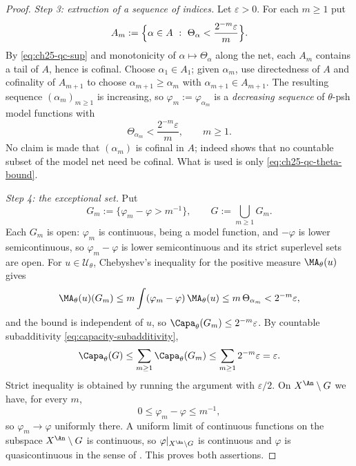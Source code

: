 \begin{proof}
\emph{Step 3: extraction of a sequence of indices.}  Let $\varepsilon>0$.
For each $m\geq1$ put
\[
 A_m:=\Bigl\{\alpha\in A\ :\
   \Theta_\alpha<\frac{2^{-m}\varepsilon}{m}\Bigr\}.
\]
By \eqref{eq:ch25-qc-sup} and monotonicity of $\alpha\mapsto\Theta_\alpha$
along the net, each $A_m$ contains a tail of $A$, hence is cofinal.
Choose $\alpha_1\in A_1$; given $\alpha_{m}$, use directedness of $A$
and cofinality of $A_{m+1}$ to choose
$\alpha_{m+1}\geq\alpha_m$ with $\alpha_{m+1}\in A_{m+1}$.  The resulting
sequence $(\alpha_m)_{m\geq1}$ is increasing, so
$\varphi_m:=\varphi_{\alpha_m}$ is a \emph{decreasing sequence} of
$\theta$-psh model functions with
\begin{equation}
\label{eq:ch25-qc-theta-bound}
 \Theta_{\alpha_m}<\frac{2^{-m}\varepsilon}{m},\qquad m\geq1 .
\end{equation}
No claim is made that $(\alpha_m)$ is cofinal in $A$; indeed
 shows that no countable subset of the
model net need be cofinal.  What is used is only
\eqref{eq:ch25-qc-theta-bound}.

\emph{Step 4: the exceptional set.}  Put
\[
 G_m:=\bigl\{\varphi_m-\varphi>m^{-1}\bigr\},
 \qquad
 G:=\bigcup_{m\geq1}G_m .
\]
Each $G_m$ is open: $\varphi_m$ is continuous, being a model function,
and $-\varphi$ is lower semicontinuous, so $\varphi_m-\varphi$ is lower
semicontinuous and its strict superlevel sets are open.  For
$u\in\mathcal U_\theta$, Chebyshev's inequality for the positive measure
$\MA_\theta(u)$ gives
\[
 \MA_\theta(u)(G_m)
 \leq m\int(\varphi_m-\varphi)\,\MA_\theta(u)
 \leq m\,\Theta_{\alpha_m}<2^{-m}\varepsilon ,
\]
and the bound is independent of $u$, so
$\Capa_\theta(G_m)\leq2^{-m}\varepsilon$.  By countable subadditivity
\eqref{eq:capacity-subadditivity},
\[
 \Capa_\theta(G)\leq\sum_{m\geq1}\Capa_\theta(G_m)
 \leq\sum_{m\geq1}2^{-m}\varepsilon=\varepsilon .
\]
Strict inequality is obtained by running the argument with
$\varepsilon/2$.  On $X^{\An}\setminus G$ we have, for every $m$,
\[
        0\leq\varphi_m-\varphi\leq m^{-1},
\]
so $\varphi_m\to\varphi$ uniformly there.  A uniform limit of continuous
functions on the subspace $X^{\An}\setminus G$ is continuous, so
$\varphi|_{X^{\An}\setminus G}$ is continuous and $\varphi$ is
quasicontinuous in the sense of
.  This proves both assertions.
\end{proof}

